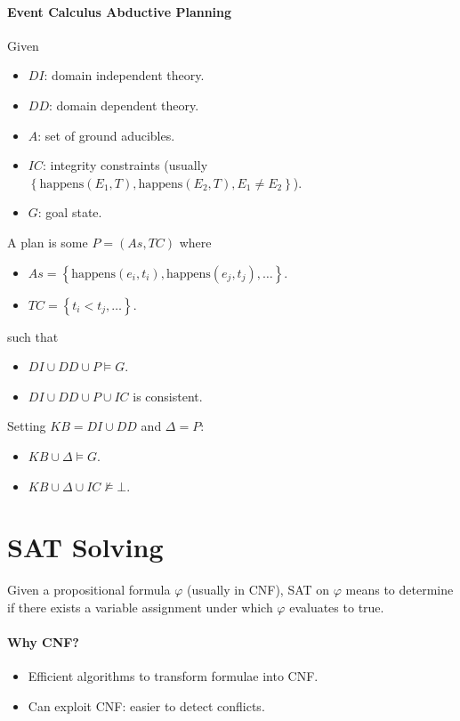 \documentclass[twocolumn,english]{article}
\begin{document}
\paragraph{Event Calculus Abductive Planning}

Given 
\begin{itemize}
\item $DI$: domain independent theory. 
\item $DD$: domain dependent theory. 
\item $A$: set of ground aducibles.
\item $IC$: integrity constraints (usually $\left\{ \text{happens}\left(E_{1},T\right),\text{happens}\left(E_{2},T\right),E_{1}\neq E_{2}\right\} $). 
\item $G$: goal state. 
\end{itemize}
A plan is some $P=\left(As,TC\right)$ where 
\begin{itemize}
\item $As=\left\{ \text{happens}\left(e_{i},t_{i}\right),\text{happens}\left(e_{j},t_{j}\right),\dots\right\} $. 
\item $TC=\left\{ t_{i}<t_{j},\dots\right\} $. 
\end{itemize}
such that 
\begin{itemize}
\item $DI\cup DD\cup P\vDash G$. 
\item $DI\cup DD\cup P\cup IC$ is consistent. 
\end{itemize}
Setting $KB=DI\cup DD$ and $\Delta=P$: 
\begin{itemize}
\item $KB\cup\Delta\vDash G$. 
\item $KB\cup\Delta\cup IC\not\vDash\bot$. 
\end{itemize}

\section{SAT Solving}

Given a propositional formula $\varphi$ (usually in CNF), SAT on
$\varphi$ means to determine if there exists a variable assignment
under which $\varphi$ evaluates to true.

\paragraph{Why CNF?}
\begin{itemize}
\item Efficient algorithms to transform formulae into CNF. 
\item Can exploit CNF: easier to detect conflicts. 
\end{itemize}
\end{document}
